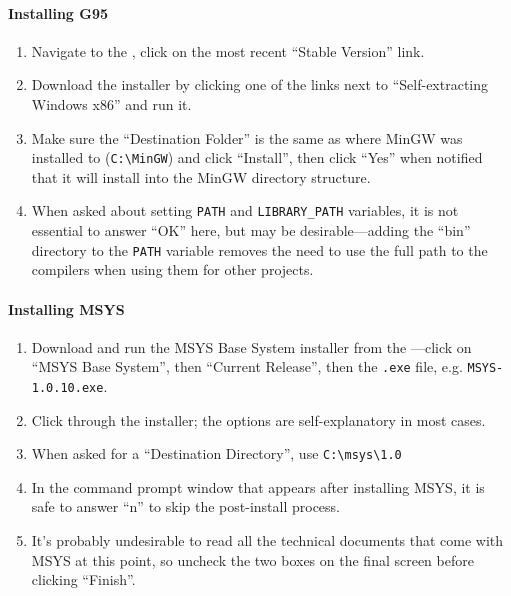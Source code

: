 \paragraph{Installing G95}

\begin{enumerate}

\item Navigate to the , click on the 
most recent ``Stable Version'' link.

\item Download the installer by clicking one of the links next to ``Self-extracting Windows x86'' 
and run it.

\item Make sure the ``Destination Folder'' is the same as where MinGW was installed to 
(\verb|C:\MinGW|) and click ``Install'', then click ``Yes'' when notified that it will install into 
the MinGW directory structure.

\item When asked about setting \verb|PATH| and \verb|LIBRARY_PATH| variables, it is not essential to 
answer ``OK'' here, but may be desirable---adding the ``bin'' directory to the \verb|PATH| variable 
removes the need to use the full path to the compilers when using them for other projects.

\end{enumerate}

\paragraph{Installing MSYS}

\begin{enumerate}

\item Download and run the MSYS Base System installer from the 
---click on ``MSYS Base 
System'', then ``Current Release'', then the \verb|.exe| file, e.g.  \verb|MSYS-1.0.10.exe|.

\item Click through the installer; the options are self-explanatory in most cases.

\item When asked for a ``Destination Directory'', use \verb|C:\msys\1.0|

\item In the command prompt window that appears after installing MSYS, it is safe to answer ``n'' to 
skip the post-install process.

\item It's probably undesirable to read all the technical documents that come with MSYS at this 
point, so uncheck the two boxes on the final screen before clicking ``Finish''.

\end{enumerate}

